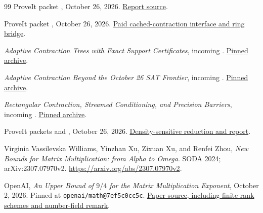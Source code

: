 \begin{thebibliography}{99}
 ProveIt packet ,
October 26, 2026.
\href{https://github.com/VladimirReshetnikov/ProveIt/blob/73dfb5e5ab6e91bd7375e5b97ef85d7e1cc8e81d/Computability/SubexponentialSAT/Research/sat_adaptive_contraction/adaptive_sat_review.tex}{Report source}.

 ProveIt packet ,
October 26, 2026.
\href{https://github.com/VladimirReshetnikov/ProveIt/blob/73dfb5e5ab6e91bd7375e5b97ef85d7e1cc8e81d/Computability/SubexponentialSAT/Research/subsat_contraction_tree/report/report.tex}{Paid cached-contraction interface and ring bridge}.

 \emph{Adaptive Contraction Trees with Exact Support Certificates},
incoming .
\href{https://github.com/VladimirReshetnikov/ProveIt/blob/73dfb5e5ab6e91bd7375e5b97ef85d7e1cc8e81d/docs/incoming/sat_adaptive_tree_certificate_2026-10-26.zip}{Pinned archive}.

 \emph{Adaptive Contraction Beyond the October 26 SAT Frontier},
incoming .
\href{https://github.com/VladimirReshetnikov/ProveIt/blob/73dfb5e5ab6e91bd7375e5b97ef85d7e1cc8e81d/docs/incoming/sat_adaptive_bounds_2026-10-26.zip}{Pinned archive}.

 \emph{Rectangular Contraction, Streamed Conditioning, and Precision Barriers},
incoming .
\href{https://github.com/VladimirReshetnikov/ProveIt/blob/73dfb5e5ab6e91bd7375e5b97ef85d7e1cc8e81d/docs/incoming/subsat_rectangular_2026-10-26.zip}{Pinned archive}.

 ProveIt packets  and
, October 26, 2026.
\href{https://github.com/VladimirReshetnikov/ProveIt/tree/73dfb5e5ab6e91bd7375e5b97ef85d7e1cc8e81d/Computability/SubexponentialSAT/Research/sat_density_improvement}{Density-sensitive reduction and report}.

 Virginia Vassilevska Williams, Yinzhan Xu,
Zixuan Xu, and Renfei Zhou, \emph{New Bounds for Matrix Multiplication:
from Alpha to Omega}. SODA 2024; arXiv:2307.07970v2.
\url{https://arxiv.org/abs/2307.07970v2}.

 OpenAI, \emph{An Upper Bound of $9/4$ for the Matrix
Multiplication Exponent}, October 2, 2026. Pinned at
\texttt{openai/math@7ef5c0cc5c}.
\href{https://github.com/openai/math/blob/7ef5c0cc5ca4b0e072b7a050fca09ab24bc6fa3a/preprints/Matrix-Multiplication-Nine-Fourths-October-2-2026/build/paper.tex}{Paper source, including finite rank schemes and number-field remark}.


\end{thebibliography}
